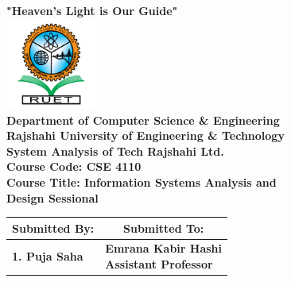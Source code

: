 \documentclass[12pt,a4paper]{article}
\begin{document}

\begin{titlepage}
    \thispagestyle{titlepage}
    \centering
    \vspace*{0.5cm}
    {\large \textbf{"Heaven's Light is Our Guide"}}\\[0.3cm]
    \includegraphics[width=3cm]{Fig/Ruet_Logo.png} \\[0.4cm]
    {\Large \textbf{Department of Computer Science \& Engineering}}\\[0.3cm]
    {\large \textbf{Rajshahi University of Engineering \& Technology}}\\[0.8cm]
    \vspace{0.8cm}
    {\LARGE \textbf{System Analysis of Tech Rajshahi Ltd.}}\\[0.2cm]
    \vspace{0.8cm}
    {\Large \textbf{Course Code: CSE 4110}}\\[0.2cm]
    \vspace{0.3cm}
    {\Large \textbf{Course Title: Information Systems Analysis and}}\\
    \vspace{0.3cm}
    {\Large \hspace{-1.0cm}\textbf{Design Sessional}}\\[0.8cm]
\begin{table}[h!]
    \centering
    \setlength{\arrayrulewidth}{1.5pt}
    \renewcommand{\arraystretch}{1.3}
    \begin{tabular}{|p{7.5cm}|p{7.5cm}|}
        \hline
        \multicolumn{1}{|c|}{\large \textbf{Submitted By:}} & \multicolumn{1}{c|}{\large \textbf{Submitted To:}} \\
        \hline
        \large \textbf{1. Puja Saha} & \multirow{10}{*}{\parbox{7.5cm}{\centering 
        \large \textbf{Emrana Kabir Hashi} \\ 
        \vspace{0.1cm}
        \textbf{Assistant Professor} \\ 
}}
\end{tabular}
\end{table}
\end{titlepage}
\end{document}
